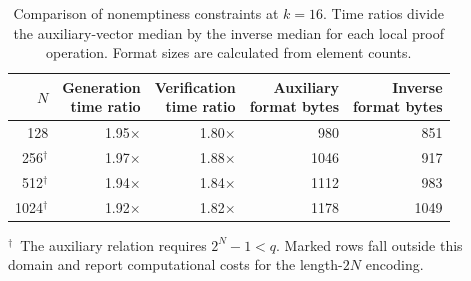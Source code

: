 \begin{table}[htbp]
\centering
\caption{Comparison of nonemptiness constraints at $k=16$. Time ratios divide the auxiliary-vector median by the inverse median for each local proof operation. Format sizes are calculated from element counts.}
\label{tab:evaluation-encoding}
\small
\begin{tabular}{r r r r r}
\toprule
$N$ & \shortstack{Generation\\time ratio} & \shortstack{Verification\\time ratio} & \shortstack{Auxiliary\\format bytes} & \shortstack{Inverse\\format bytes} \\
\midrule
128 & 1.95$\times$ & 1.80$\times$ & 980 & 851 \\
256$^\dagger$ & 1.97$\times$ & 1.88$\times$ & 1046 & 917 \\
512$^\dagger$ & 1.94$\times$ & 1.84$\times$ & 1112 & 983 \\
1024$^\dagger$ & 1.92$\times$ & 1.82$\times$ & 1178 & 1049 \\
\bottomrule
\end{tabular}
\par\smallskip
\begin{minipage}{0.92\linewidth}\footnotesize $^\dagger$~The auxiliary relation requires $2^N-1<q$. Marked rows fall outside this domain and report computational costs for the length-$2N$ encoding.\end{minipage}
\end{table}
